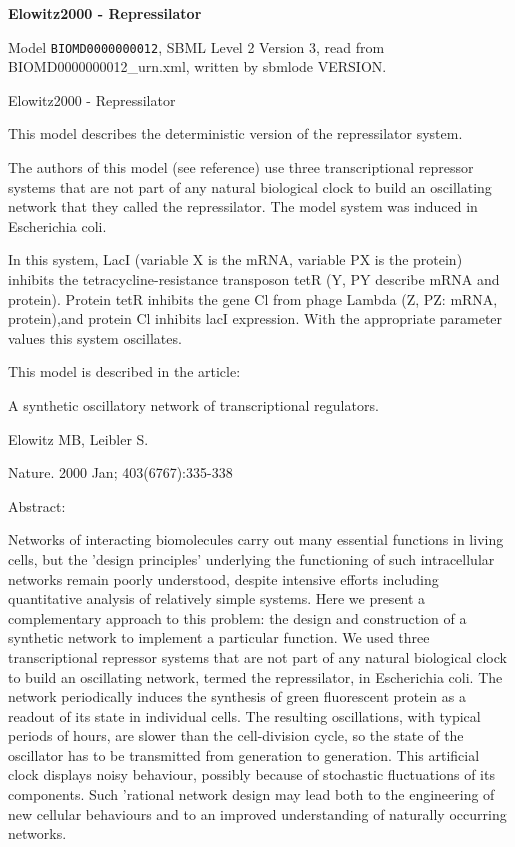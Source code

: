 \documentclass{article}
\begin{document}
{\centering\LARGE\bfseries Elowitz2000 - Repressilator\par}
\bigskip

Model \texttt{BIOMD0000000012}, SBML Level 2 Version 3, read from BIOMD0000000012\_\allowbreak{}urn.xml, written by sbmlode VERSION.

Elowitz2000 - Repressilator

This model describes the deterministic version of the repressilator system.

The authors of this model (see reference) use three transcriptional repressor systems that are not part of any natural biological clock to build an oscillating network that they called the repressilator. The model system was induced in Escherichia coli.

In this system, LacI (variable X is the mRNA, variable PX is the protein) inhibits the tetracycline-resistance transposon tetR (Y, PY describe mRNA and protein). Protein tetR inhibits the gene Cl from phage Lambda (Z, PZ: mRNA, protein),and protein Cl inhibits lacI expression. With the appropriate parameter values this system oscillates.

This model is described in the article:

A synthetic oscillatory network of transcriptional regulators.

Elowitz MB, Leibler S.

Nature. 2000 Jan; 403(6767):335-338

Abstract:

Networks of interacting biomolecules carry out many essential functions in living cells, but the 'design principles' underlying the functioning of such intracellular networks remain poorly understood, despite intensive efforts including quantitative analysis of relatively simple systems. Here we present a complementary approach to this problem: the design and construction of a synthetic network to implement a particular function. We used three transcriptional repressor systems that are not part of any natural biological clock to build an oscillating network, termed the repressilator, in Escherichia coli. The network periodically induces the synthesis of green fluorescent protein as a readout of its state in individual cells. The resulting oscillations, with typical periods of hours, are slower than the cell-division cycle, so the state of the oscillator has to be transmitted from generation to generation. This artificial clock displays noisy behaviour, possibly because of stochastic fluctuations of its components. Such 'rational network design may lead both to the engineering of new cellular behaviours and to an improved understanding of naturally occurring networks.
\end{document}
